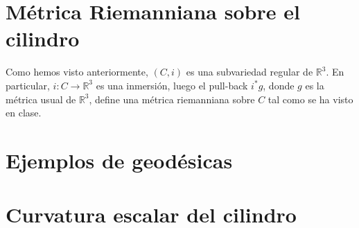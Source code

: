 \documentclass[twoside, 11pt]{article}
\theoremstyle{definition}
\newcommand{\R}{\mathbb{R}}
\begin{document}
\section{Métrica Riemanniana sobre el cilindro}

Como hemos visto anteriormente, $(C,i)$ es una subvariedad regular de $\R^3$. En particular, $i:C\to \R^3$ es una inmersión, luego el pull-back $i^*g$, donde $g$ es la métrica usual de $\R^3$, define una métrica riemanniana sobre $C$ tal como se ha visto en clase.


\section{Ejemplos de geodésicas}




\section{Curvatura escalar del cilindro}
\end{document}
